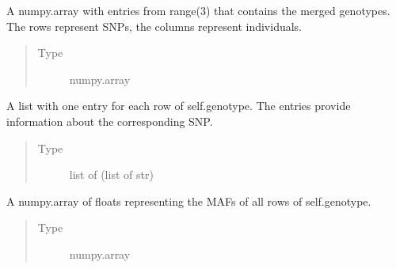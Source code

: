 \documentclass[a4paper,10pt,english]{sphinxhowto}
\begin{document}
\begin{fulllineitems}
\begin{fulllineitems}
\begin{quote}
\begin{description}
\end{description}\end{quote}

\end{fulllineitems}


\begin{fulllineitems}
\label{\detokenize{utils:utils.genotype_corpus_generator.GenotypeCorpusGenerator.genotype}}
A numpy.array with entries from range(3) that contains the merged genotypes.
The rows represent SNPs, the columns represent individuals.
\begin{quote}\begin{description}
\item[{Type}] \leavevmode
numpy.array

\end{description}\end{quote}

\end{fulllineitems}


\begin{fulllineitems}
\label{\detokenize{utils:utils.genotype_corpus_generator.GenotypeCorpusGenerator.snps}}
A list with one entry for each row of self.genotype. The entries provide information
about the corresponding SNP.
\begin{quote}\begin{description}
\item[{Type}] \leavevmode
list of (list of str)

\end{description}\end{quote}

\end{fulllineitems}


\begin{fulllineitems}
\label{\detokenize{utils:utils.genotype_corpus_generator.GenotypeCorpusGenerator.mafs}}
A numpy.array of floats representing the MAFs of all rows of self.genotype.
\begin{quote}\begin{description}
\item[{Type}] \leavevmode
numpy.array


\end{description}
\end{quote}
\end{fulllineitems}
\end{fulllineitems}
\end{document}
